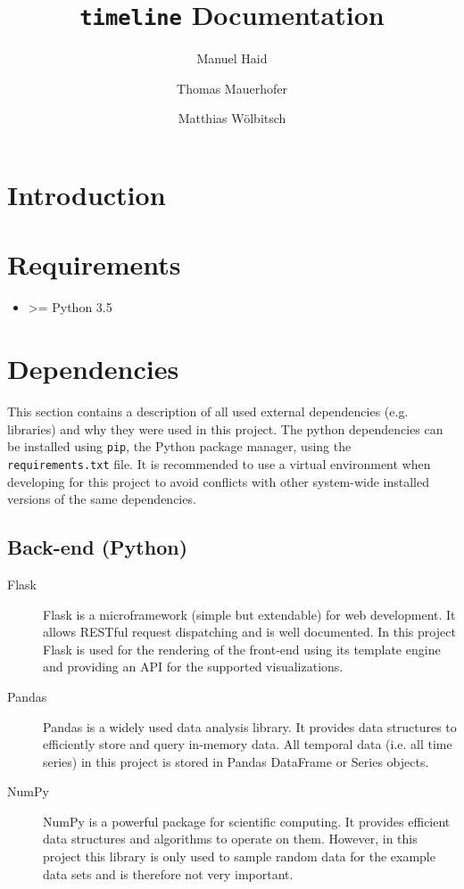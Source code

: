 \documentclass[11pt, a4paper]{article}
\author{Manuel Haid \and Thomas Mauerhofer \and Matthias Wölbitsch}
\title{\texttt{timeline} Documentation}
\begin{document}
\maketitle
\tableofcontents

\section{Introduction} \label{sec:intoduction}


\section{Requirements} \label{sec:requirments}

\begin{itemize}
 \item \textgreater= Python 3.5
\end{itemize}
 

\section{Dependencies} \label{sec:dependencies}

This section contains a description of all used external dependencies (e.g. libraries) and why they were used in this project.
The python dependencies can be installed using \texttt{pip}, the Python package manager, using the \texttt{requirements.txt} file. 
It is recommended to use a virtual environment when developing for this project to avoid conflicts with other system-wide installed versions of the same dependencies.


\subsection{Back-end (Python)}

\begin{description}
 \item[Flask] 
 Flask is a microframework (simple but extendable) for web development. 
 It allows RESTful request dispatching and is well documented. 
 In this project Flask is used for the rendering of the front-end using its template engine and providing an API for the supported visualizations.
 
 \item[Pandas] 
 Pandas is a widely used data analysis library. 
 It provides data structures to efficiently store and query in-memory data. 
 All temporal data (i.e. all time series) in this project is stored in Pandas DataFrame or Series objects. 
 
 \item[NumPy] 
 NumPy is a powerful package for scientific computing. 
 It provides efficient data structures and algorithms to operate on them. 
 However, in this project this library is only used to sample random data for the example data sets and is therefore not very important. 
\end{description}
\end{document}
